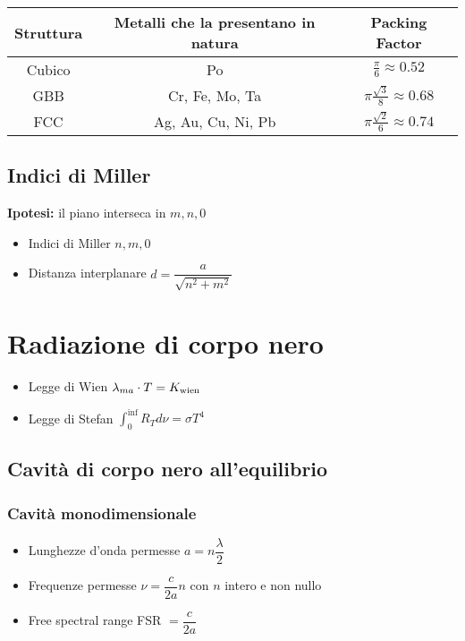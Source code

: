 \documentclass{article}
\begin{document}
\vspace{1cm}
\renewcommand{\arraystretch}{2}
\begin{tabular}{|c|c|c|}
\hline 
\textbf{Struttura} & \textbf{Metalli che la presentano in natura} & \textbf{Packing Factor} \\ 
\hline 
Cubico & Po & \(\frac{\pi}{6} \approx 0.52 \) \\ 
\hline 
GBB & Cr, Fe, Mo, Ta & \(\pi \frac{\sqrt{3}}{8} \approx 0.68 \) \\ 
\hline 
FCC & Ag, Au, Cu, Ni, Pb & \(\pi \frac{\sqrt{2}}{6} \approx 0.74 \) \\ 
\hline 
\end{tabular} 
\renewcommand{\arraystretch}{1}
\vspace{1cm}

\subsection{Indici di Miller} 
\textbf{Ipotesi:} il piano interseca in \( {m, n, 0} \)
\begin{itemize}
	\item Indici di Miller \( {n, m, 0} \)
	\item Distanza interplanare \( d = \dfrac{a}{\sqrt{n^2+m^2}} \)
\end{itemize}

\section{Radiazione di corpo nero}
\begin{itemize}
	\item Legge di Wien \( \lambda_{ma} \cdot T = K_{\textnormal{wien}} \)
	\item Legge di Stefan \( \displaystyle \int_{0}^{\inf} R_T d \nu = \sigma T ^ 4 \)
\end{itemize}
\subsection{Cavità di corpo nero all'equilibrio}
\subsubsection{Cavità monodimensionale}
\begin{itemize}
	\item Lunghezze d'onda permesse \( a = n \dfrac{\lambda}{2} \)
	\item Frequenze permesse \( \nu = \dfrac{c}{2a} n \) con \( n \) intero e non nullo
	\item Free spectral range FSR \( = \dfrac{c}{2a} \)
\end{itemize}
\end{document}
